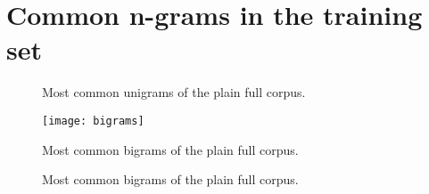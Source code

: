 \chapter{Common n-grams in the training set}
\label{appendix:stats}

\begin{figure}[!htbp]
	  \centering
	  
	      \caption{Most common unigrams of the plain full corpus.}
	      \label{figure:commonunigrams}
\end{figure}

\begin{figure}[!htbp]
	  \centering
	  \texttt{[image: bigrams]}
	      \caption{Most common bigrams of the plain full corpus.}
	      \label{figure:commonbigrams}
\end{figure}

\begin{figure}[!htbp]
	  \centering
	  
	      \caption{Most common bigrams of the plain full corpus.}
	      \label{figure:commontrigrams}
\end{figure}


